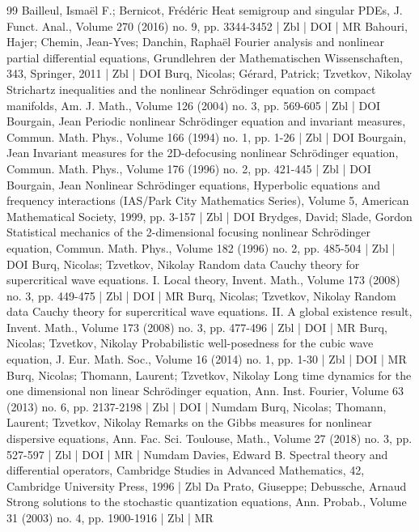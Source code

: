 \documentclass[10pt]{amsart}
\theoremstyle{definition}\newtheorem{defi}[theo]{Definition}\newtheorem{rema}[theo]{Remark}\newtheorem{exam}[theo]{Example}\newtheorem{exem}[theo]{Example}\newtheorem{nota}[theo]{Notation}
\begin{document}
\begin{thebibliography}{99}
 Bailleul, Ismaël F.; Bernicot, Frédéric Heat semigroup and singular PDEs, J. Funct. Anal., Volume 270 (2016) no. 9, pp. 3344-3452 | Zbl | DOI | MR
 Bahouri, Hajer; Chemin, Jean-Yves; Danchin, Raphaël Fourier analysis and nonlinear partial differential equations, Grundlehren der Mathematischen Wissenschaften, 343, Springer, 2011 | Zbl | DOI
 Burq, Nicolas; Gérard, Patrick; Tzvetkov, Nikolay Strichartz inequalities and the nonlinear Schrödinger equation on compact manifolds, Am. J. Math., Volume 126 (2004) no. 3, pp. 569-605 | Zbl | DOI
 Bourgain, Jean Periodic nonlinear Schrödinger equation and invariant measures, Commun. Math. Phys., Volume 166 (1994) no. 1, pp. 1-26 | Zbl | DOI
 Bourgain, Jean Invariant measures for the 2D-defocusing nonlinear Schrödinger equation, Commun. Math. Phys., Volume 176 (1996) no. 2, pp. 421-445 | Zbl | DOI
 Bourgain, Jean Nonlinear Schrödinger equations, Hyperbolic equations and frequency interactions (IAS/Park City Mathematics Series), Volume 5, American Mathematical Society, 1999, pp. 3-157 | Zbl | DOI
 Brydges, David; Slade, Gordon Statistical mechanics of the 2-dimensional focusing nonlinear Schrödinger equation, Commun. Math. Phys., Volume 182 (1996) no. 2, pp. 485-504 | Zbl | DOI
 Burq, Nicolas; Tzvetkov, Nikolay Random data Cauchy theory for supercritical wave equations. I. Local theory, Invent. Math., Volume 173 (2008) no. 3, pp. 449-475 | Zbl | DOI | MR
 Burq, Nicolas; Tzvetkov, Nikolay Random data Cauchy theory for supercritical wave equations. II. A global existence result, Invent. Math., Volume 173 (2008) no. 3, pp. 477-496 | Zbl | DOI | MR
 Burq, Nicolas; Tzvetkov, Nikolay Probabilistic well-posedness for the cubic wave equation, J. Eur. Math. Soc., Volume 16 (2014) no. 1, pp. 1-30 | Zbl | DOI | MR
 Burq, Nicolas; Thomann, Laurent; Tzvetkov, Nikolay Long time dynamics for the one dimensional non linear Schrödinger equation, Ann. Inst. Fourier, Volume 63 (2013) no. 6, pp. 2137-2198 | Zbl | DOI | Numdam
 Burq, Nicolas; Thomann, Laurent; Tzvetkov, Nikolay Remarks on the Gibbs measures for nonlinear dispersive equations, Ann. Fac. Sci. Toulouse, Math., Volume 27 (2018) no. 3, pp. 527-597 | Zbl | DOI | MR | Numdam
 Davies, Edward B. Spectral theory and differential operators, Cambridge Studies in Advanced Mathematics, 42, Cambridge University Press, 1996 | Zbl
 Da Prato, Giuseppe; Debussche, Arnaud Strong solutions to the stochastic quantization equations, Ann. Probab., Volume 31 (2003) no. 4, pp. 1900-1916 | Zbl | MR

\end{thebibliography}
\end{document}
